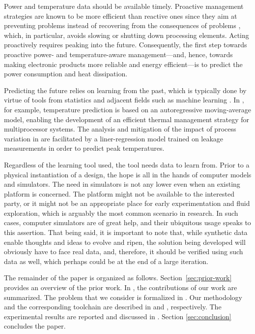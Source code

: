 Power and temperature data should be available timely. Proactive management
strategies are known to be more efficient than reactive ones since they aim at
preventing problems instead of recovering from the consequences of problems
\cite{coskun2008, chaudhry2015}, which, in particular, avoids slowing or
shutting down processing elements. Acting proactively requires peaking into the
future. Consequently, the first step towards proactive power- and
temperature-aware management---and, hence, towards making electronic products
more reliable and energy efficient---is to predict the power consumption and
heat dissipation.

Predicting the future relies on learning from the past, which is typically done
by virtue of tools from statistics and adjacent fields such as machine learning
\cite{bishop2006}. In \cite{coskun2008}, for example, temperature prediction is
based on an autoregressive moving-average model, enabling the development of an
efficient thermal management strategy for multiprocessor systems. The analysis
and mitigation of the impact of process variation in \cite{juan2014} are
facilitated by a liner-regression model trained on leakage measurements in order
to predict peak temperatures.

Regardless of the learning tool used, the tool needs data to learn from. Prior
to a physical instantiation of a design, the hope is all in the hands of
computer models and simulators. The need in simulators is not any lower even
when an existing platform is concerned. The platform might not be available to
the interested party, or it might not be an appropriate place for early
experimentation and fluid exploration, which is arguably the most common
scenario in research. In such cases, computer simulators are of great help, and
their ubiquitous usage speaks to this assertion. That being said, it is
important to note that, while synthetic data enable thoughts and ideas to evolve
and ripen, the solution being developed will obviously have to face real data,
and, therefore, it should be verified using such data as well, which perhaps
could be at the end of a large iteration.

The remainder of the paper is organized as follows. Section~\ref{sec:prior-work}
provides an overview of the prior work. In , the
contributions of our work are summarized. The problem that we consider is
formalized in . Our methodology and the corresponding
toolchain are described in  and ,
respectively. The experimental results are reported and discussed in
. Section \ref{sec:conclusion} concludes the paper.
